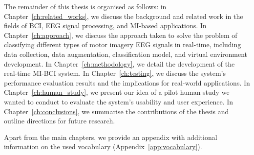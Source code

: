 The remainder of this thesis is organised as follows: in Chapter~\ref{ch:related_works}, we discuss the background and related work in the fields of BCI, EEG signal processing, and MI-based applications.
In Chapter~\ref{ch:approach}, we discuss the approach taken to solve the problem of classifying different types of motor imagery EEG signals in real-time, including data collection, data augmentation, classification model, and virtual environment development.
In Chapter~\ref{ch:methodology}, we detail the development of the real-time MI-BCI system. %
In Chapter~\ref{ch:testing}, we discuss the system's performance evaluation results and the implications for real-world applications.
In Chapter~\ref{ch:human_study}, we present our idea of a pilot human study we wanted to conduct to evaluate the system's usability and user experience.
In Chapter~\ref{ch:conclusions}, we summarise the contributions of the thesis and outline directions for future research.

Apart from the main chapters, we provide an appendix with additional information on the used vocabulary (Appendix~\ref{app:vocabulary}).
